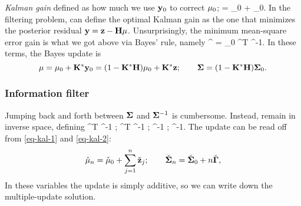 \documentclass[notitlepage,openany,11pt]{report}
\theoremstyle{plain}%
\numberwithin{equation}{section}
\begin{document}
\emph{Kalman gain} defined as how much we use $\mathbf{y}_0$ to correct $\mathbf{\mu}_{0}$;
\be
\mbf{\mu} = \mbf{\mu}_{0} +  _0.
\ee
In the filtering problem, can define the optimal Kalman gain as the one that minimizes the posterior residual $\mathbf{y} = \mathbf{z} - \mathbf{H} \mathbf{\mu}$. Unsurprisingly, the minimum mean-square error gain is what we got above via Bayes' rule, namely
\be
{}^{\ast} = \mbf{\Sigma}_0 ^{T} ^{-1}.
\ee
In these terms, the Bayes update is
\begin{equation}
\mathbf{\mu} = \mathbf{\mu}_0 + \mathbf{K}^{\ast} \mathbf{y}_0 = (1 - \mathbf{K}^{\ast} \mathbf{H})\mathbf{\mu}_0 + \mathbf{K}^{\ast}\mathbf{z}; \qquad \mathbf{\Sigma} = (1 - \mathbf{K}^{\ast} \mathbf{H}) \mathbf{\Sigma}_0.
\end{equation}

%
%
%


\subsubsection{Information filter}

Jumping back and forth between $\mathbf{\Sigma}$ and $\mathbf{\Sigma}^{-1}$ is cumbersome. Instead, remain in inverse space, defining
\be
\check{\mbf{\Gamma}} \equiv {}^{T} \mbf{\Gamma}^{-1} ; \qquad {} \equiv {}^{T} \mbf{\Gamma}^{-1} ; 
\qquad \check{\mbf{\mu}} \equiv \mbf{\Sigma}^{-1} \mbf \mu; \qquad \check{\mbf{\Sigma}} \equiv \mbf{\Sigma}^{-1}. 
\ee
The update can be read off from \eqref{eq-kal-1} and \eqref{eq-kal-2}:
\begin{equation}
\check{\mathbf{\mu}}_{n} = \check{\mathbf{\mu}}_{0} + \sum_{j=1}^{n} \check{\mathbf{z}}_j; \qquad \check{\mathbf{\Sigma}}_n = \check{\mathbf{\Sigma}}_0 + n \check{\mathbf{\Gamma}},
\end{equation}
In these variables the update is simply additive, so we can write down the multiple-update solution.
\end{document}
